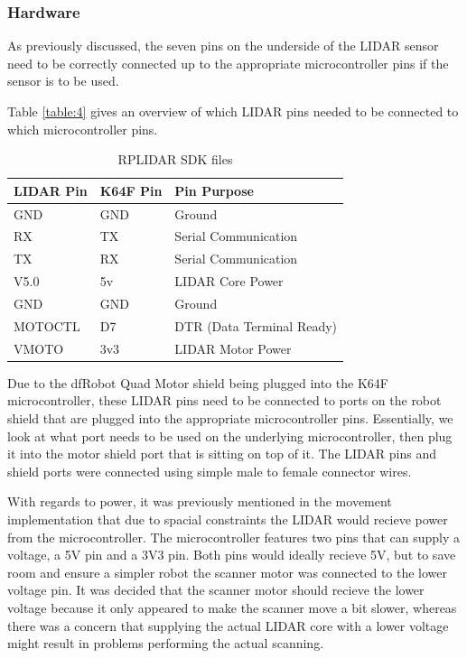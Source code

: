 				\subsubsection{Hardware}
				As previously discussed, the seven pins on the underside of the LIDAR sensor need to be correctly connected up to the appropriate microcontroller pins if the sensor is to be used.
				
				Table \ref{table:4} gives an overview of which LIDAR pins needed to be connected to which microcontroller pins.
				
				\begin{table}[h!]
					\centering
					\begin{tabular}{|| l | l | l ||} 
						\hline
						LIDAR Pin & K64F Pin & Pin Purpose \\ [0.5ex] 
						\hline
						GND  & GND & Ground  \\ 
						RX  & TX  & Serial Communication \\
						TX  & RX & Serial Communication \\
						V5.0 & 5v & LIDAR Core Power \\ 
						GND & GND & Ground \\ 
						MOTOCTL & D7 & DTR (Data Terminal Ready) \\ 
						VMOTO & 3v3 & LIDAR Motor Power \\ [1ex] 
						\hline
					\end{tabular}
					\caption{RPLIDAR SDK files}
					\label{table:3}
				\end{table}
			
				Due to the dfRobot Quad Motor shield being plugged into the K64F microcontroller, these LIDAR pins need to be connected to ports on the robot shield that are plugged into the appropriate microcontroller pins. Essentially, we look at what port needs to be used on the underlying microcontroller, then plug it into the motor shield port that is sitting on top of it. The LIDAR pins and shield ports were connected using simple male to female connector wires.
				
				With regards to power, it was previously mentioned in the movement implementation that due to spacial constraints the LIDAR would recieve power from the microcontroller. The microcontroller features two pins that can supply a voltage, a 5V pin and a 3V3 pin. Both pins would ideally recieve 5V, but to save room and ensure a simpler robot the scanner motor was connected to the lower voltage pin. It was decided that the scanner motor should recieve the lower voltage because it only appeared to make the scanner move a bit slower, whereas there was a concern that supplying the actual LIDAR core with a lower voltage might result in problems performing the actual scanning. 
				
